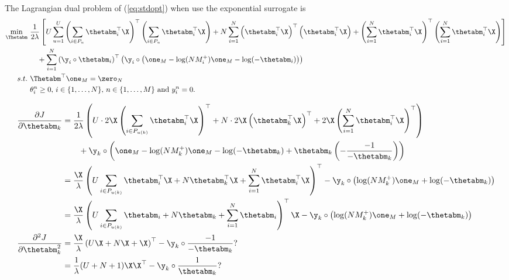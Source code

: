 The Lagrangian dual problem of (\ref{eq:stdopt}) when use the exponential surrogate is
\begin{equation}
\label{eq:dual}
\begin{aligned}
\min_{\Thetabm} \ & \frac{1}{2 \lambda} \left[
     U \sum_{u=1}^U \left( \sum_{i \in P_u} \thetabm_i^\top \X \right)^\top \left( \sum_{i \in P_u} \thetabm_i^\top \X \right)
   + N \sum_{i=1}^N \left( \thetabm_i^\top \X \right)^\top \left( \thetabm_i^\top \X \right)
   + \left( \sum_{i=1}^N \thetabm_i^\top \X \right)^\top \left( \sum_{i=1}^N \thetabm_i^\top \X \right) \right] \\
& \hspace{1em}
   + \sum_{i=1}^N \left( \y_i \circ \thetabm_i \right)^\top 
     \left( \y_i \circ \left(\one_M - \log(N M_i^+) \one_M - \log(-\thetabm_i) \right) \right) \\
s.t. \ & \Thetabm^\top \one_M = \zero_N \\
           & \theta_i^n \ge 0, \, i \in \{1,\dots,N\}, \, n \in \{1,\dots,M\} \ \mathrm{and} \ y_i^n = 0.
\end{aligned}
\end{equation}


\begin{equation}
\begin{aligned}
\frac{\partial J}{\partial \thetabm_k}
&= \frac{1}{2 \lambda} \left( U \cdot 2 \X \left(\sum_{i \in P_{u(k)}} \thetabm_i^\top \X \right)^\top 
   + N \cdot 2 \X \left( \thetabm_k^\top \X \right)^\top
   + 2 \X \left(\sum_{i=1}^N \thetabm_i^\top \X \right)^\top \right) \\
& \hspace{2em}
   + \y_k \circ \left( \one_M - \log(N M_k^+) \one_M - \log(-\thetabm_k) + \thetabm_k \left( -\frac{-1}{-\thetabm_k} \right) \right) \\
&= \frac{\X}{\lambda} \left( U \sum_{i \in P_{u(k)}} \thetabm_i^\top \X 
   + N \thetabm_k^\top \X 
   + \sum_{i=1}^N \thetabm_i^\top \X \right)^\top
   - \y_k \circ \left( \log(N M_k^+) \one_M + \log(-\thetabm_k) \right) \\
&= \frac{\X}{\lambda} \left( U \sum_{i \in P_{u(k)}} \thetabm_i + N \thetabm_k + \sum_{i=1}^N \thetabm_i \right)^\top \X
   - \y_k \circ \left( \log(N M_k^+) \one_M + \log(-\thetabm_k) \right) \\
%
\frac{\partial^2 J}{\partial \thetabm_k^2}
&= \frac{\X}{\lambda} \left( U \X + N \X + \X \right)^\top
   - \y_k \circ \frac{-1}{-\thetabm_k} ? \\
&= \frac{1}{\lambda} (U + N + 1) \X \X^\top 
   - \y_k \circ \frac{1}{\thetabm_k} ? \\
\end{aligned}
\end{equation}
